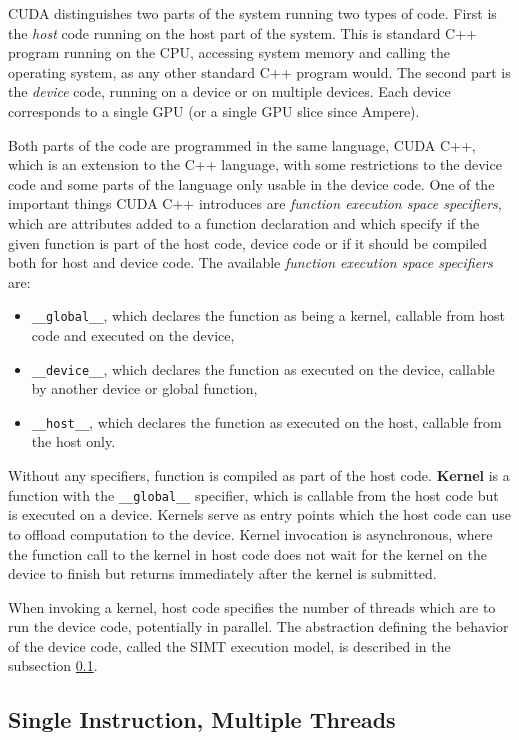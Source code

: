 CUDA distinguishes two parts of the system running two types of code. First is the \textit{host} code running on the host part of the system. This is standard C++ program running on the CPU, accessing system memory and calling the operating system, as any other standard C++ program would. The second part is the \textit{device} code, running on a device or on multiple devices. Each device corresponds to a single GPU (or a single GPU slice since Ampere).

Both parts of the code are programmed in the same language, CUDA C++, which is an extension to the C++ language, with some restrictions to the device code and some parts of the language only usable in the device code.
One of the important things CUDA C++ introduces are \textit{function execution space specifiers}, which are attributes added to a function declaration and which specify if the given function is part of the host code, device code or if it should be compiled both for host and device code. The available \textit{function execution space specifiers} are:
\begin{itemize}
	\item \texttt{\_\_global\_\_}, which declares the function as being a kernel, callable from host code and executed on the device,
	\item \texttt{\_\_device\_\_}, which declares the function as executed on the device, callable by another device or global function,
	\item \texttt{\_\_host\_\_}, which declares the function as executed on the host, callable from the host only.
\end{itemize}

Without any specifiers, function is compiled as part of the host code. \textbf{Kernel} is a function with the \texttt{\_\_global\_\_} specifier, which is callable from the host code but is executed on a device. Kernels serve as entry points which the host code can use to offload computation to the device. Kernel invocation is asynchronous, where the function call to the kernel in host code does not wait for the kernel on the device to finish but returns immediately after the kernel is submitted.

When invoking a kernel, host code specifies the number of threads which are to run the device code, potentially in parallel. The abstraction defining the behavior of the device code, called the SIMT execution model, is described in the subsection \ref{sec:simt}.

\subsection{Single Instruction, Multiple Threads}
\label{sec:simt}

